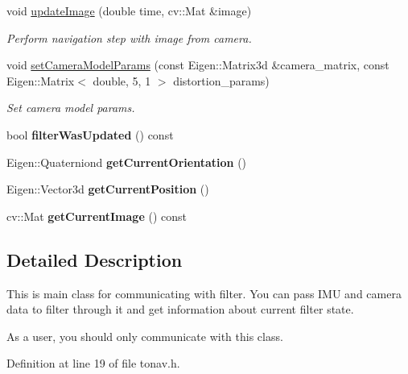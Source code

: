 \begin{DoxyCompactItemize}
void \hyperlink{class_tonav_a765f593b621a40052a01b7d0449d9b8e}{update\-Image} (double time, cv\-::\-Mat \&image)
\begin{DoxyCompactList}\small\item\em Perform navigation step with image from camera. \end{DoxyCompactList}\item 
void \hyperlink{class_tonav_a53fddfad248ab9a75906e310266e1f0d}{set\-Camera\-Model\-Params} (const Eigen\-::\-Matrix3d \&camera\-\_\-matrix, const Eigen\-::\-Matrix$<$ double, 5, 1 $>$ distortion\-\_\-params)
\begin{DoxyCompactList}\small\item\em Set camera model params. \end{DoxyCompactList}\item 
\hypertarget{class_tonav_a6cd97922b947734bca02119a60135c30}{bool {\bfseries filter\-Was\-Updated} () const }\label{class_tonav_a6cd97922b947734bca02119a60135c30}

\item 
\hypertarget{class_tonav_a724c0d36fb1f182023831f70fa166e55}{Eigen\-::\-Quaterniond {\bfseries get\-Current\-Orientation} ()}\label{class_tonav_a724c0d36fb1f182023831f70fa166e55}

\item 
\hypertarget{class_tonav_a4717848cb42b3311e19d656de940bc65}{Eigen\-::\-Vector3d {\bfseries get\-Current\-Position} ()}\label{class_tonav_a4717848cb42b3311e19d656de940bc65}

\item 
\hypertarget{class_tonav_a3929b594397489b232e77e4344c8675a}{cv\-::\-Mat {\bfseries get\-Current\-Image} () const }\label{class_tonav_a3929b594397489b232e77e4344c8675a}

\end{DoxyCompactItemize}


\subsection{Detailed Description}
This is main class for communicating with filter. You can pass I\-M\-U and camera data to filter through it and get information about current filter state. 

As a user, you should only communicate with this class. 

Definition at line 19 of file tonav.\-h.



